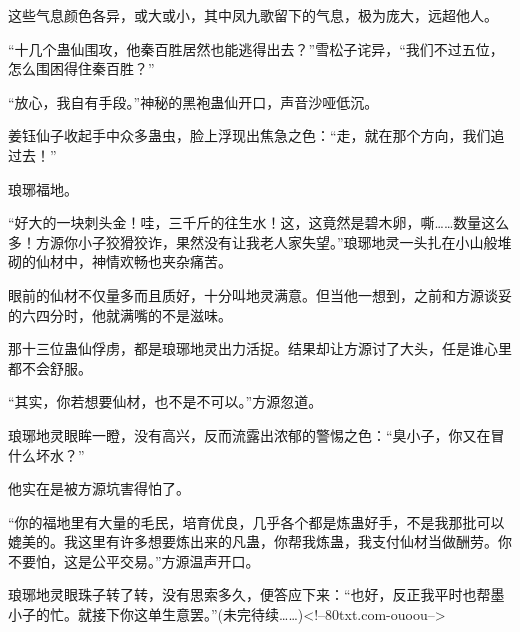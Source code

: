 \begin{this_body}
这些气息颜色各异，或大或小，其中凤九歌留下的气息，极为庞大，远超他人。

“十几个蛊仙围攻，他秦百胜居然也能逃得出去？”雪松子诧异，“我们不过五位，怎么围困得住秦百胜？”

“放心，我自有手段。”神秘的黑袍蛊仙开口，声音沙哑低沉。

姜钰仙子收起手中众多蛊虫，脸上浮现出焦急之色：“走，就在那个方向，我们追过去！”

琅琊福地。

“好大的一块刺头金！哇，三千斤的往生水！这，这竟然是碧木卵，嘶……数量这么多！方源你小子狡猾狡诈，果然没有让我老人家失望。”琅琊地灵一头扎在小山般堆砌的仙材中，神情欢畅也夹杂痛苦。

眼前的仙材不仅量多而且质好，十分叫地灵满意。但当他一想到，之前和方源谈妥的六四分时，他就满嘴的不是滋味。

那十三位蛊仙俘虏，都是琅琊地灵出力活捉。结果却让方源讨了大头，任是谁心里都不会舒服。

“其实，你若想要仙材，也不是不可以。”方源忽道。

琅琊地灵眼眸一瞪，没有高兴，反而流露出浓郁的警惕之色：“臭小子，你又在冒什么坏水？”

他实在是被方源坑害得怕了。

“你的福地里有大量的毛民，培育优良，几乎各个都是炼蛊好手，不是我那批可以媲美的。我这里有许多想要炼出来的凡蛊，你帮我炼蛊，我支付仙材当做酬劳。你不要怕，这是公平交易。”方源温声开口。

琅琊地灵眼珠子转了转，没有思索多久，便答应下来：“也好，反正我平时也帮墨小子的忙。就接下你这单生意罢。”(未完待续……)<!--80txt.com-ouoou-->

\end{this_body}

